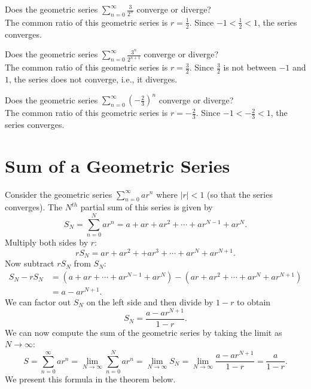 \documentclass{ximera}
\begin{document}
\begin{example}
Does the geometric series $\displaystyle{\sum_{n=0}^\infty \frac{3}{2^n}}$ converge or diverge?\\
The common ratio of this geometric series is $r = \frac12$. Since $-1 < \frac 12 < 1$,
the series converges.
\end{example}



\begin{example}
Does the geometric series $\displaystyle{\sum_{n=0}^\infty \frac{3^n}{2^{n+1}}}$ converge or diverge?\\
The common ratio of this geometric series is $r = \frac32$. Since $\frac32$ is not between $-1$ and $1$,
the series does not converge, i.e., it diverges.
\end{example}



\begin{example}
Does the geometric series $\displaystyle{\sum_{n=0}^\infty \left(-\frac23\right)^n }$ converge or diverge?\\
The common ratio of this geometric series is $r = -\frac23$. Since $-1 < -\frac23 < 1$,
the series converges.
\end{example}

\section{Sum of a Geometric Series}

Consider the geometric series $\sum_{n=0}^\infty ar^n$ where $|r| < 1$ (so that the series converges).
The $N^{th}$ partial sum of this series is given by
\[
S_N = \sum_{n=0}^N ar^n = a + ar + ar^2 + \cdots + ar^{N-1} + ar^N.
\]
Multiply both sides by $r$:
\[
rS_N =  ar + ar^2 + + ar^3 + \cdots  + ar^N + ar^{N+1}.
\] 
Now subtract $rS_N$ from $S_N$:
\begin{align*}
S_N - rS_N &= \left(a + ar + \cdots + ar^{N-1} + ar^N\right) - \left(ar + ar^2 + \cdots  + ar^N + ar^{N+1} \right)\\
           &= a - ar^{N+1}.
\end{align*}
We can factor out $S_N$ on the left side and then divide by $1-r$ to obtain
\[
S_N = \frac{a - ar^{N+1}}{1-r}.
\]
We can now compute the sum of the geometric series by taking the limit as $N \to \infty$:
\[
S = \sum_{n=0}^\infty ar^n = \lim_{N \to \infty} \sum_{n=0}^N ar^n = \lim_{N \to \infty} S_N = \lim_{N \to \infty} \frac{a - ar^{N+1}}{1-r} = \frac{a}{1-r}.
\]
We present this formula in the theorem below.
\end{document}
